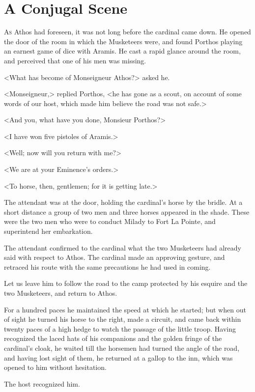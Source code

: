 
\chapter{A Conjugal Scene}

\lettrine[]{A}{s} Athos had foreseen, it was not long before the cardinal came down. He opened the door of the room in which the Musketeers were, and found Porthos playing an earnest game of dice with Aramis. He cast a rapid glance around the room, and perceived that one of his men was missing. 

<What has become of Monseigneur Athos?> asked he. 

<Monseigneur,> replied Porthos, <he has gone as a scout, on account of some words of our host, which made him believe the road was not safe.> 

<And you, what have you done, Monsieur Porthos?> 

<I have won five pistoles of Aramis.> 

<Well; now will you return with me?> 

<We are at your Eminence's orders.> 

<To horse, then, gentlemen; for it is getting late.> 

The attendant was at the door, holding the cardinal's horse by the bridle. At a short distance a group of two men and three horses appeared in the shade. These were the two men who were to conduct Milady to Fort La Pointe, and superintend her embarkation. 

The attendant confirmed to the cardinal what the two Musketeers had already said with respect to Athos. The cardinal made an approving gesture, and retraced his route with the same precautions he had used in coming. 

Let us leave him to follow the road to the camp protected by his esquire and the two Musketeers, and return to Athos. 

For a hundred paces he maintained the speed at which he started; but when out of sight he turned his horse to the right, made a circuit, and came back within twenty paces of a high hedge to watch the passage of the little troop. Having recognized the laced hats of his companions and the golden fringe of the cardinal's cloak, he waited till the horsemen had turned the angle of the road, and having lost sight of them, he returned at a gallop to the inn, which was opened to him without hesitation. 

The host recognized him. 

